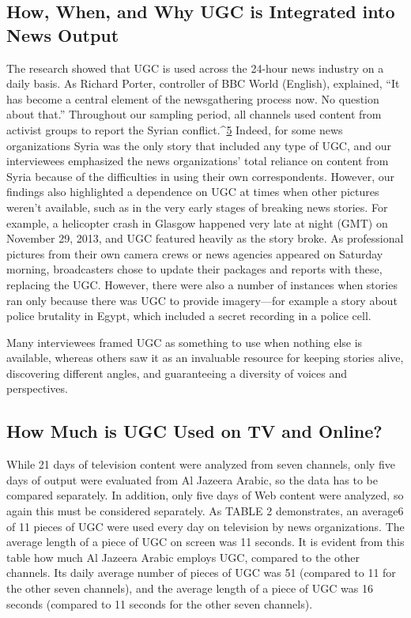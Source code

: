 \begin{enumerate}
\chapter{How, When, and Why UGC is Integrated into News Output}
The research showed that UGC is used across the 24-hour news industry
on a daily basis. As Richard Porter, controller of BBC World (English),
explained, ``It has become a central element of the newsgathering process
now. No question about that.''
Throughout our sampling period, all channels used content from activist
groups to report the Syrian conflict.^{\href{#endnotes}{5}} Indeed, for some news organizations
Syria was the only story that included any type of UGC, and our interviewees
emphasized the news organizations' total reliance on content from Syria
because of the difficulties in using their own correspondents. However, our
findings also highlighted a dependence on UGC at times when other pictures
weren't available, such as in the very early stages of breaking news
stories. For example, a helicopter crash in Glasgow happened very late at
night (GMT) on November 29, 2013, and UGC featured heavily as the story
broke. As professional pictures from their own camera crews or news agencies
appeared on Saturday morning, broadcasters chose to update their
packages and reports with these, replacing the UGC.
However, there were also a number of instances when stories ran only
because there was UGC to provide imagery—for example a story about
police brutality in Egypt, which included a secret recording in a police cell.

Many interviewees framed UGC as something to use when nothing else is
available, whereas others saw it as an invaluable resource for keeping stories
alive, discovering different angles, and guaranteeing a diversity of voices
and perspectives.
\section{How Much is UGC Used on TV and Online?}
While 21 days of television content were analyzed from seven channels,
only five days of output were evaluated from Al Jazeera Arabic, so the data
has to be compared separately. In addition, only five days of Web content
were analyzed, so again this must be considered separately.
As TABLE 2 demonstrates, an average6 of 11 pieces of UGC were used every
day on television by news organizations. The average length of a piece of
UGC on screen was 11 seconds. It is evident from this table how much
Al Jazeera Arabic employs UGC, compared to the other channels. Its daily
average number of pieces of UGC was 51 (compared to 11 for the other
seven channels), and the average length of a piece of UGC was 16 seconds
(compared to 11 seconds for the other seven channels).



\end{enumerate}
